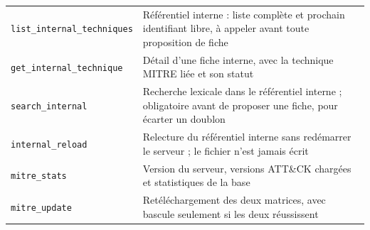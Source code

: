\begin{longtable}[]{@{}
  >{\raggedright\arraybackslash}p{}
  >{\raggedright\arraybackslash}p{}@{}}
\texttt{list\_internal\_techniques} & Référentiel interne : liste complète et prochain identifiant libre, à appeler avant toute proposition de fiche \\
\texttt{get\_internal\_technique} & Détail d'une fiche interne, avec la technique MITRE liée et son statut \\
\texttt{search\_internal} & Recherche lexicale dans le référentiel interne ; obligatoire avant de proposer une fiche, pour écarter un doublon \\
\texttt{internal\_reload} & Relecture du référentiel interne sans redémarrer le serveur ; le fichier n'est jamais écrit \\
\texttt{mitre\_stats} & Version du serveur, versions ATT\&CK chargées et statistiques de la base \\
\texttt{mitre\_update} & Retéléchargement des deux matrices, avec bascule seulement si les deux réussissent \\
\end{longtable}


